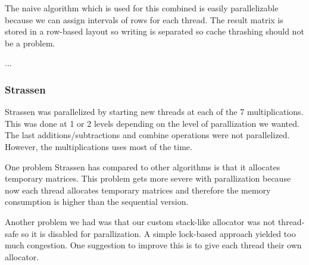 The naive algorithm which is used for this combined is easily parallelizable because we can assign intervals of rows for each thread. The result matrix is stored in a row-based layout so writing is separated so cache thrashing should not be a problem.

...



\subsubsection{Strassen}

Strassen was parallelized by starting new threads at each of the 7 multiplications. This was done at 1 or 2 levels depending on the level of parallization we wanted. The last additions/subtractions and combine operations were not parallelized. However, the multiplications uses most of the time.

One problem Strassen has compared to other algorithms is that it allocates temporary matrices. This problem gets more severe with parallization because now each thread allocates temporary matrices and therefore the memory consumption is higher than the sequential version.

Another problem we had was that our custom stack-like allocator was not thread-safe so it is disabled for parallization. A simple lock-based approach yielded too much congestion. One suggestion to improve this is to give each thread their own allocator.

